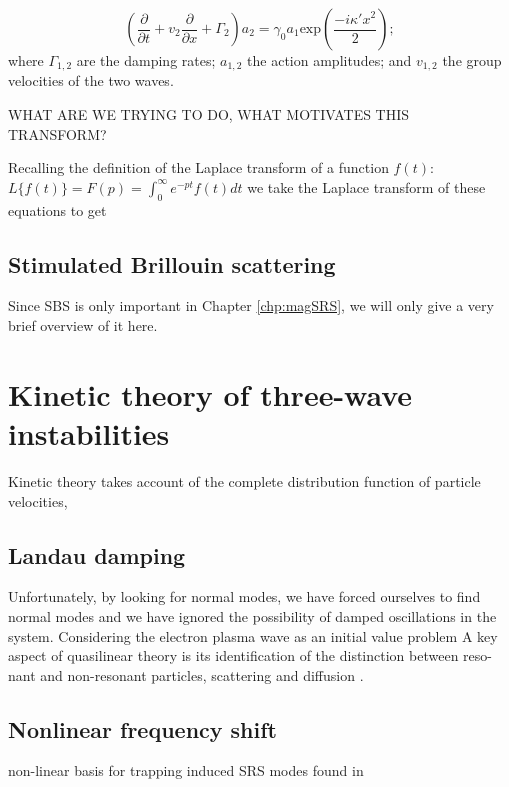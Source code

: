 \begin{equation}
 \left(\frac{\partial}{\partial t} + v_2\frac{\partial}{\partial x} + \Gamma_2 \right)a_2 = \gamma_0a_1\text{exp}\left(\frac{-i\kappa'x^2}{2}\right);
\end{equation} 
where $\Gamma_{1,2}$ are the damping rates; $a_{1,2}$ the action amplitudes; and $v_{1,2}$ the group velocities of the two waves. 

WHAT ARE WE TRYING TO DO, WHAT MOTIVATES THIS TRANSFORM?

Recalling the definition of the Laplace transform of a function $f(t)$: $L\{f(t)\}= F(p) = \int_0^\infty e^{-pt} f(t) dt$ we take the Laplace transform of these equations to get






\subsection{Stimulated Brillouin scattering}
Since SBS is only important in Chapter \ref{chp:magSRS}, we will only give a very brief overview of it here.




\section{Kinetic theory of three-wave instabilities}\label{sec:kineticTheory}

Kinetic theory takes account of the complete distribution function of particle velocities, 

\subsection{Landau damping}


Unfortunately, by looking for normal modes, we have forced ourselves to find normal modes and we have ignored the possibility of damped oscillations in the system. Considering the electron plasma wave as an initial value problem 
A key aspect of quasilinear theory is its identification of the distinction between reso-
nant and non-resonant particles, scattering and diffusion \citep{Sagdeev2018}.

\subsection{Nonlinear frequency shift}
non-linear basis for trapping induced SRS modes found in \cite{Rose2001}


